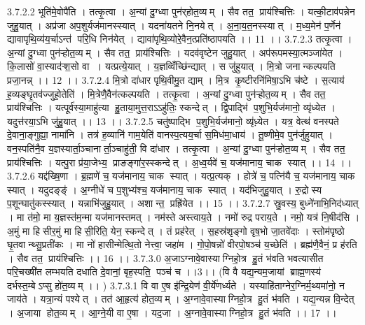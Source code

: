 3.7.2.2
भूति॑मे॒वोपै॑ति । तत्कृ॒त्वा । अ॒न्यां दु॒ग्ध्वा पुन॑र्‌होत॒व्यम् । सैव तत॒ प्राय॑श्चित्तिः । यत्की॒टाव॑पन्नेन जुहु॒यात् । अप्र॑जा अप॒शुर्यज॑मानस्स्यात् । यदना॑यतने नि॒नयेत् । अ॒ना॒य॒त॒नस्स्यात् । म॒ध्य॒मेन॑ प॒र्णेन॑ द्यावापृथि॒व्य॑य॒र्चाऽन्त॑ परि॒धि निन॑येत् । द्यावा॑पृथि॒व्योरे॒वैन॒त्प्रति॑ष्ठापयति ।। 11 ।।
3.7.2.3
तत्कृ॒त्वा । अ॒न्यां दु॒ग्ध्वा पुन॑ऱ्होत॒व्यम् । सैव तत॒ प्राय॑श्चित्तिः । यदव॑वृष्टेन जुहु॒यात् । अप॑रूपमस्या॒त्मञ्जा॑येत । कि॒लासो॑ वा॒स्याद॑ऱ्श॒सो वा । यत्प्रत्ये॒यात् । य॒ज्ञव्विँच्छि॑न्द्यात् । स जु॑हुयात् । मि॒त्रो जनान्कल्पयति प्रजा॒नन्न् ।। 12 ।।
3.7.2.4
मि॒त्रो दा॑धार पृथि॒वीमु॒त द्याम् । मि॒त्र कृ॒ष्टीरनि॑मिषा॒ऽभि च॑ष्टे । स॒त्याय॑ ह॒व्यङ्घृ॒तव॑ज्जुहो॒तेति॑ । मि॒त्रेणै॒वैन॑त्कल्पयति । तत्कृ॒त्वा । अ॒न्यां दु॒ग्ध्वा पुन॑ऱ्होत॒व्यम् । सैव तत॒ प्राय॑श्चित्तिः । यत्पूर्व॑स्या॒माहु॑त्या हु॒ताया॒मुत्त॒राऽऽहु॑तिः॒ स्कन्देत् । द्वि॒पाद्भि॑ प॒शुभि॒र्यज॑मानो॒ व्यृ॑ध्येत । यदुत्त॑रया॒ऽभि जु॑हु॒यात् ।। 13 ।।
3.7.2.5
चतु॑ष्पाद्भि प॒शुभि॒र्यज॑मानो॒ व्यृ॑ध़्येत । यत्र॒ वेत्थ॑ वनस्पते दे॒वाना॒ङ्गुह्या॒ नामा॑नि । तत्र॑ ह॒व्यानि॑ गाम॒येति॑ वानस्प॒त्यय॒र्चा स॒मिध॑मा॒धाय॑ । तू॒ष्णीमे॒व पुन॑र्जुहुयात् । वन॒स्पति॑नै॒व य॒ज्ञस्यार्ता॒ञ्चानार्ता॒ञ्चाहु॑ती॒ वि दा॑धार । तत्कृ॒त्वा । अ॒न्यां दु॒ग्ध्वा पुन॑ऱ्होत॒व्यम् । सैव तत॒ प्राय॑श्चित्तिः । यत्पु॒रा प्र॑या॒जेभ्य॒ प्राङङ्गा॑र॒स्स्कन्देत् । अ॒ध्व॒र्यवे॑ च॒ यज॑मानाय॒ चाक॑ स्यात् ।। 14 ।।
3.7.2.6
यद्द॑ख्षि॒णा । ब्र॒ह्मणे॑ च॒ यज॑मानाय॒ चाक॑ स्यात् । यत्प्र॒त्यक् । होत्रे॑ च॒ पत्नि॑यै च॒ यज॑मानाय॒ चाक॑ स्यात् । यदुदङ्ङ्॑ । अ॒ग्नीधे॑ च प॒शुभ्य॑श्च॒ यज॑मानाय॒ चाक॑ स्यात् । यद॑भिजुहु॒यात् । रु॒द्रोस्य प॒शून्घातु॑कस्स्यात् । यन्नाभि॑जुहु॒यात् । अशान्त॒ प्रह्रि॑येत ।। 15 ।।
3.7.2.7
स्रु॒वस्य॒ बुध्ने॑नाभि॒निद॑ध्यात् । मा त॑मो॒ मा य॒ज्ञस्त॑म॒न्मा यज॑मानस्तमत् । नम॑स्ते अस्त्वाय॒ते । नमो॑ रुद्र पराय॒ते । नमो॒ यत्र॑ नि॒षीद॑सि । अ॒मुं मा हि॑सीर॒मुं मा हि॑सी॒रिति॒ येन॒ स्कन्देत् । तं प्रह॑रेत् । स॒हस्र॑शृङ्गो वृष॒भो जा॒तवे॑दाः । स्तोम॑पृष्ठो घृ॒तवान्थ्सु॒प्रती॑कः । मा नो॑ हासीन्मेत्थि॒तो नेत्त्वा॒ जहा॑म । गो॒पो॒षन्नो॑ वीरपो॒षञ्च॑ य॒च्छेति॑ । ब्रह्म॑णै॒वैनं॒ प्र ह॑रति । सैव तत॒ प्राय॑श्चित्तिः ।। 16 ।।
3.7.3.0
अ॒जाऽग्नावे॒वास्याग्निहो॒त्र हु॒तं भ॑वति भवत्यासीत परि॒चख्षी॑त लम्भयति दधाति दे॒वानां॒ बृह॒स्पति॒ पञ्च॑ च ।।3।। (वि वै यद्य॒न्यम॒जायां ब्राह्म॒णस्य॑ दर्भस्त॒म्बेऽप्सु हो॑त॒व्यम् ।। )
3.7.3.1
वि वा ए॒ष इ॑न्द्रि॒येण॑ वी॒र्ये॑णर्ध्यते । यस्याहि॑ताग्नेर॒ग्निर्म॒थ्यमा॑नो॒ न जाय॑ते । यत्रा॒न्यं पश्येत् । तत॑ आ॒हृत्य॑ होत॒व्यम् । अ॒ग्नावे॒वास्याग्निहो॒त्र हु॒तं भ॑वति । यद्य॒न्यन्न वि॒न्देत् । अ॒जाया॑ होत॒व्यम् । आ॒ग्ने॒यी वा ए॒षा । यद॒जा । अ॒ग्नावे॒वास्याग्निहो॒त्र हु॒तं भ॑वति ।। 17 ।।
